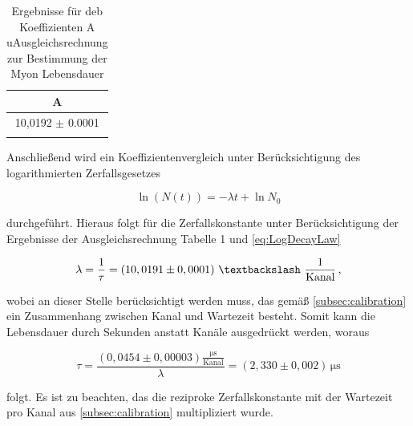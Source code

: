 \begin{table}[h!]
  \centering
\begin{tabular}{c} \toprule
A    \\ \midrule
10,0192 $\pm$ 0.0001 \\
\bottomrule
\label{tab:Fit}
\end{tabular}
\caption{Ergebnisse für deb Koeffizienten A uAusgleichsrechnung zur Bestimmung der Myon Lebensdauer}
\end{table}

Anschließend wird ein Koeffizientenvergleich unter Berücksichtigung des logarithmierten Zerfallsgesetzes

\begin{equation}
\ln(N(t)) = -\lambda t + \ln{N_0}
\label{eq:LogDecayLaw}
\end{equation}

\noindent durchgeführt. Hieraus folgt für die Zerfallskonstante unter Berücksichtigung der Ergebnisse der Ausgleichsrechnung Tabelle 1 und \ref{eq:LogDecayLaw}

\begin{equation}
\lambda = \frac{1}{\tau} = (10,0191 \pm 0,0001) \,\, \textbackslash \,\, \frac{1}{\text{Kanal}}\,,
\end{equation}

\noindent wobei an dieser Stelle berücksichtigt werden muss, das gemäß \ref{subsec:calibration} ein Zusammenhang zwischen Kanal und Wartezeit besteht. Somit kann
die Lebensdauer durch Sekunden anstatt Kanäle ausgedrückt werden, woraus

\begin{equation}
\tau = \frac{(0,0454 \pm 0,00003) \frac{\si{\micro\second}}{\text{Kanal}}}{\lambda} = (2,330 \pm 0,002) \, \si{\micro\second}
\end{equation}

\noindent folgt. Es ist zu beachten, das die reziproke Zerfallskonstante mit der Wartezeit pro Kanal aus \ref{subsec:calibration} multipliziert wurde.
